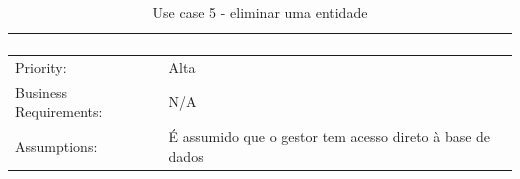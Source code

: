\documentclass{scrreprt}
\begin{document}
\begin{table}[H]
\begin{adjustbox}{width=1.2\textwidth,center=\textwidth}
\begin{tabular}{|m{4cm}|m{12cm}|}
\begin{enumerate}
            \end{enumerate} \\
            \hline
            Priority: & Alta \\
            \hline
            Business Requirements: & N/A \\
            \hline
            Assumptions: & É assumido que o gestor tem acesso direto à base de dados \\
            \hline
        \end{tabular}
    \end{adjustbox}
    \caption{Use case 5 - eliminar uma entidade}
    \label{use case 5}
\end{table}

\end{document}
